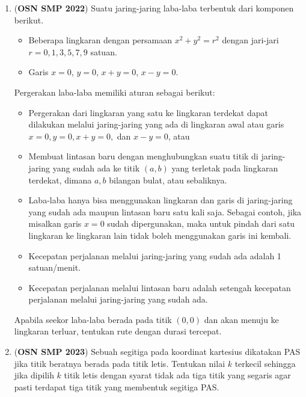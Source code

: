 \documentclass[12pt]{scrartcl}
\begin{document}
\begin{enumerate}[resume]
    \item (\textbf{OSN SMP 2022}) Suatu jaring-jaring laba-laba terbentuk dari komponen berikut.
    \begin{itemize}
        \item Beberapa lingkaran dengan persamaan $x^{2}+y^{2}=r^{2}$ dengan jari-jari $r=0,1,3,5,7,9$ satuan.
        \item Garis $x=0$, $y=0$, $x+y=0$, $x-y=0$.
    \end{itemize}
    Pergerakan laba-laba memiliki aturan sebagai berikut:
    \begin{itemize}
        \item Pergerakan dari lingkaran yang satu ke lingkaran terdekat dapat dilakukan melalui jaring-jaring yang ada di lingkaran awal atau garis $x=0, y=0, x+y=0,$ dan $x-y=0$, atau
        \item Membuat lintasan baru dengan menghubungkan suatu titik di jaring-jaring yang sudah ada ke titik $(a, b)$ yang terletak pada lingkaran terdekat, dimana $a, b$ bilangan bulat, atau sebaliknya.
        \item Laba-laba hanya bisa menggunakan lingkaran dan garis di jaring-jaring yang sudah ada maupun lintasan baru satu kali saja. Sebagai contoh, jika misalkan garis $x=0$ sudah dipergunakan, maka untuk pindah dari satu lingkaran ke lingkaran lain tidak boleh menggunakan garis ini kembali.
        \item Kecepatan perjalanan melalui jaring-jaring yang sudah ada adalah 1 satuan/menit.
        \item Kecepatan perjalanan melalui lintasan baru adalah setengah kecepatan perjalanan melalui jaring-jaring yang sudah ada.
    \end{itemize}
    Apabila seekor laba-laba berada pada titik $(0,0)$ dan akan menuju ke lingkaran terluar, tentukan rute dengan durasi tercepat.

    \item (\textbf{OSN SMP 2023}) Sebuah segitiga pada koordinat kartesius dikatakan PAS jika titik beratnya berada pada titik letis. Tentukan nilai $k$ terkecil sehingga jika dipilih $k$ titik letis dengan syarat tidak ada tiga titik yang segaris agar pasti terdapat tiga titik yang membentuk segitiga PAS.


\end{enumerate}
\end{document}
